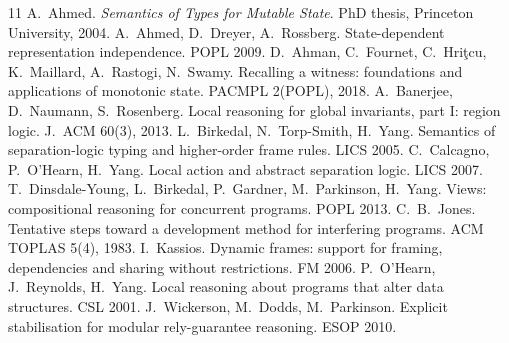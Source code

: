 \documentclass[10pt,a4paper]{article}
\theoremstyle{definition}
\theoremstyle{remark}
\begin{document}
\begin{thebibliography}{11}\small\itemsep0pt
 A.~Ahmed. \emph{Semantics of Types for Mutable State}. PhD thesis, Princeton University, 2004.
 A.~Ahmed, D.~Dreyer, A.~Rossberg. State-dependent representation independence. POPL 2009.
 D.~Ahman, C.~Fournet, C.~Hri\c{t}cu, K.~Maillard, A.~Rastogi, N.~Swamy. Recalling a witness: foundations and applications of monotonic state. PACMPL 2(POPL), 2018.
 A.~Banerjee, D.~Naumann, S.~Rosenberg. Local reasoning for global invariants, part I: region logic. J.~ACM 60(3), 2013.
 L.~Birkedal, N.~Torp-Smith, H.~Yang. Semantics of separation-logic typing and higher-order frame rules. LICS 2005.
 C.~Calcagno, P.~O'Hearn, H.~Yang. Local action and abstract separation logic. LICS 2007.
 T.~Dinsdale-Young, L.~Birkedal, P.~Gardner, M.~Parkinson, H.~Yang. Views: compositional reasoning for concurrent programs. POPL 2013.
 C.~B.~Jones. Tentative steps toward a development method for interfering programs. ACM TOPLAS 5(4), 1983.
 I.~Kassios. Dynamic frames: support for framing, dependencies and sharing without restrictions. FM 2006.
 P.~O'Hearn, J.~Reynolds, H.~Yang. Local reasoning about programs that alter data structures. CSL 2001.
 J.~Wickerson, M.~Dodds, M.~Parkinson. Explicit stabilisation for modular rely-guarantee reasoning. ESOP 2010.
\end{thebibliography}
\end{document}

